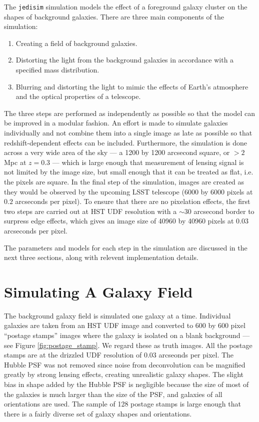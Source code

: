\documentclass[10pt,twoside]{article}
\theoremstyle{definition}
\theoremstyle{exercise}
\begin{document}
The \texttt{jedisim} simulation models the effect of a foreground galaxy cluster on the shapes of background galaxies. There are three main components of the simulation:
\begin{enumerate}
  \item Creating a field of background galaxies.
  \item Distorting the light from the background galaxies in accordance with a specified mass distribution.
  \item Blurring and distorting the light to mimic the effects of Earth's atmosphere and the optical properties of a telescope. 
\end{enumerate}
The three steps are performed as independently as possible so that the model can be improved in a modular fashion. An effort is made to simulate galaxies individually and not combine them into a single image as late as possible so that redshift-dependent effects can be included. Furthermore, the simulation is done across a very wide area of the sky --- a 1200 by 1200 arcsecond square, or $>2$ Mpc at $z = 0.3$ --- which is large enough that measurement of lensing signal is not limited by the image size, but small enough that it can be treated as flat, i.e. the pixels are square. In the final step of the simulation, images are created as they would be observed by the upcoming LSST telescope (6000 by 6000 pixels at $0.2$ arcseconds per pixel). To ensure that there are no pixelation effects, the first two steps are carried out at HST UDF resolution with a $\sim$30 arcsecond border to surpress edge effects, which gives an image size of 40960 by 40960 pixels at $0.03$ arcseconds per pixel. 

The parameters and models for each step in the simulation are discussed in the next three sections, along with relevent implementation details. 

\section{Simulating A Galaxy Field}
\label{sec:background}
The background galaxy field is simulated one galaxy at a time. Individual galaxies are taken from an HST UDF image and converted to 600 by 600 pixel ``postage stamps'' images where the galaxy is isolated on a blank background --- see Figure \ref{fig:postage_stamp}. We regard these as truth images. All the postage stamps are at the drizzled UDF resolution of 0.03 arcseonds per pixel. The Hubble PSF was not removed since noise from deconvolution can be magnified greatly by strong lensing effects, creating unrealistic galaxy shapes. The slight bias in shape added by the Hubble PSF is negligible because the size of most of the galaxies is much larger than the size of the PSF, and galaxies of all orientations are used. The sample of 128 postage stamps is large enough that there is a fairly diverse set of galaxy shapes and orientations.
\end{document}
